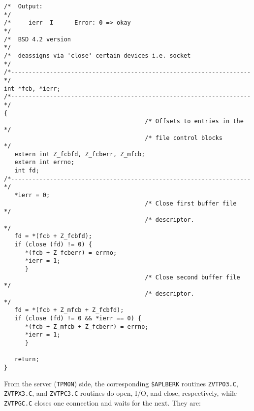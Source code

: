 \begin{center}
\begin{verbatim}
/*  Output:                                                           */
/*     ierr  I      Error: 0 => okay                                  */
/*  BSD 4.2 version                                                   */
/*  deassigns via 'close' certain devices i.e. socket                 */
/*--------------------------------------------------------------------*/
int *fcb, *ierr;
/*--------------------------------------------------------------------*/
{
                                        /* Offsets to entries in the  */
                                        /* file control blocks        */
   extern int Z_fcbfd, Z_fcberr, Z_mfcb;
   extern int errno;
   int fd;
/*--------------------------------------------------------------------*/
   *ierr = 0;
                                        /* Close first buffer file    */
                                        /* descriptor.                */
   fd = *(fcb + Z_fcbfd);
   if (close (fd) != 0) {
      *(fcb + Z_fcberr) = errno;
      *ierr = 1;
      }
                                        /* Close second buffer file   */
                                        /* descriptor.                */
   fd = *(fcb + Z_mfcb + Z_fcbfd);
   if (close (fd) != 0 && *ierr == 0) {
      *(fcb + Z_mfcb + Z_fcberr) = errno;
      *ierr = 1;
      }

   return;
}

\end{verbatim}
\end{center}

From the server ({\tt TPMON}) side, the corresponding {\tt \$APLBERK}
routines {\tt ZVTPO3.C}, {\tt ZVTPX3.C}, and {\tt ZVTPC3.C} routines
do open, I/O, and close, respectively, while {\tt ZVTPGC.C} closes one
connection and waits for the next.  They are:

